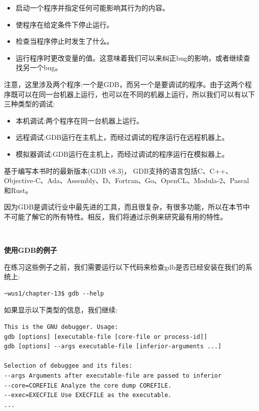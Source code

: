 \begin{itemize}
	\item 启动一个程序并指定任何可能影响其行为的内容。
	\item 使程序在给定条件下停止运行。
	\item 检查当程序停止时发生了什么。
	\item 运行程序时更改变量的值。这意味着我们可以来纠正bug的影响，或者继续查找另一个bug。
\end{itemize}

注意，这里涉及两个程序:一个是GDB，而另一个是要调试的程序。由于这两个程序既可以在同一台机器上运行，也可以在不同的机器上运行，所以我们可以有以下三种类型的调试: \par

\begin{itemize}
	\item 本机调试:两个程序在同一台机器上运行。
	\item 远程调试:GDB运行在主机上，而经过调试的程序运行在远程机器上。
	\item 模拟器调试:GDB运行在主机上，而经过调试的程序运行在模拟器上。
\end{itemize}

基于编写本书时的最新版本(GDB v8.3)， GDB支持的语言包括C、C++、Objective-C、Ada、Assembly、D、Fortran、Go、OpenCL、Modula-2、Pascal和Rust。 \par
因为GDB是调试行业中最先进的工具，而且很复杂，有很多功能，所以在本节中不可能了解它的所有特性。相反，我们将通过示例来研究最有用的特性。 \par

\noindent\textbf{}\ \par
\textbf{使用GDB的例子} \ \par
在练习这些例子之前，我们需要运行以下代码来检查gdb是否已经安装在我们的系统上: \par

\begin{lstlisting}[caption={}]
~wus1/chapter-13$ gdb --help
\end{lstlisting}

如果显示以下类型的信息，我们继续:\par

\begin{lstlisting}[caption={}]
This is the GNU debugger. Usage:
gdb [options] [executable-file [core-file or process-id]]
gdb [options] --args executable-file [inferior-arguments ...]

Selection of debuggee and its files:
--args Arguments after executable-file are passed to inferior
--core=COREFILE Analyze the core dump COREFILE.
--exec=EXECFILE Use EXECFILE as the executable.
...
\end{lstlisting}

